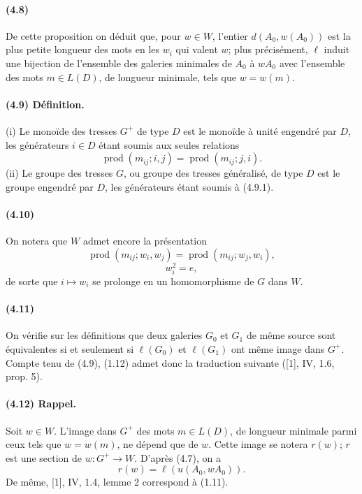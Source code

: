 \documentclass[10pt]{article}
\newcommand{\prodalt}{\operatorname{prod}}
\begin{document}
\paragraph{(4.8)} De cette proposition on déduit que, pour \(w\in W\), l'entier \(d(A_0,w(A_0))\) est la plus petite longueur des mots en les \(w_i\) qui valent \(w\); plus précisément, \(\ell\) induit une bijection de l'ensemble des galeries minimales de \(A_0\) à \(wA_0\) avec l'ensemble des mots \(m\in L(D)\), de longueur minimale, tels que \(w=w(m)\).

\paragraph{(4.9) Définition.} (i) Le monoïde des tresses \(G^+\) de type \(D\) est le monoïde à unité engendré par \(D\), les générateurs \(i\in D\) étant soumis aux seules relations
\[
\tag{4.9.1}
\prodalt(m_{ij};i,j)=\prodalt(m_{ij};j,i).
\]
(ii) Le groupe des tresses \(G\), ou groupe des tresses généralisé, de type \(D\) est le groupe engendré par \(D\), les générateurs étant soumis à (4.9.1).

\paragraph{(4.10)} On notera que \(W\) admet encore la présentation
\[
\tag{4.10.1}
\prodalt(m_{ij};w_i,w_j)=\prodalt(m_{ij};w_j,w_i),
\]
\[
\tag{4.10.2}
w_i^2=e,
\]
de sorte que \(i\mapsto w_i\) se prolonge en un homomorphisme de \(G\) dans \(W\).

\paragraph{(4.11)} On vérifie sur les définitions que deux galeries \(G_0\) et \(G_1\) de même source sont équivalentes si et seulement si \(\ell(G_0)\) et \(\ell(G_1)\) ont même image dans \(G^+\). Compte tenu de (4.9), (1.12) admet donc la traduction suivante ([1], IV, 1.6, prop. 5).

\paragraph{(4.12) Rappel.} Soit \(w\in W\). L'image dans \(G^+\) des mots \(m\in L(D)\), de longueur minimale parmi ceux tels que \(w=w(m)\), ne dépend que de \(w\). Cette image se notera \(r(w)\); \(r\) est une section de \(w:G^+\to W\). D'après (4.7), on a
\[
r(w)=\ell(u(A_0,wA_0)).
\]
De même, [1], IV, 1.4, lemme 2 correspond à (1.11).
\end{document}

